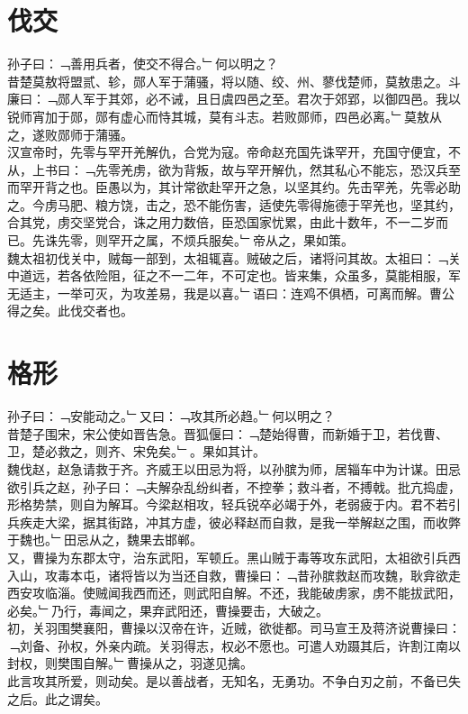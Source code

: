 \chapter{伐交}%
孙子曰：﹁善用兵者，使交不得合。﹂何以明之？\\
昔楚莫敖将盟贰、轸，郧人军于蒲骚，将以随、绞、州、蓼伐楚师，莫敖患之。斗廉曰：﹁郧人军于其郊，必不诫，且日虞四邑之至。君次于郊郢，以御四邑。我以锐师宵加于郧，郧有虚心而恃其城，莫有斗志。若败郧师，四邑必离。﹂莫敖从之，遂败郧师于蒲骚。\\
汉宣帝时，先零与罕开羌解仇，合党为寇。帝命赵充国先诛罕开，充国守便宜，不从，上书曰：﹁先零羌虏，欲为背叛，故与罕开解仇，然其私心不能忘，恐汉兵至而罕开背之也。臣愚以为，其计常欲赴罕开之急，以坚其约。先击罕羌，先零必助之。今虏马肥、粮方饶，击之，恐不能伤害，适使先零得施德于罕羌也，坚其约，合其党，虏交坚党合，诛之用力数倍，臣恐国家忧累，由此十数年，不一二岁而已。先诛先零，则罕开之属，不烦兵服矣。﹂帝从之，果如策。\\
魏太祖初伐关中，贼每一部到，太祖辄喜。贼破之后，诸将问其故。太祖曰：﹁关中道远，若各依险阻，征之不一二年，不可定也。皆来集，众虽多，莫能相服，军无适主，一举可灭，为攻差易，我是以喜。﹂语曰：连鸡不俱栖，可离而解。曹公得之矣。此伐交者也。
%
%
\chapter{格形}%
孙子曰：﹁安能动之。﹂又曰：﹁攻其所必趋。﹂何以明之？\\
昔楚子围宋，宋公使如晋告急。晋狐偃曰：﹁楚始得曹，而新婚于卫，若伐曹、卫，楚必救之，则齐、宋免矣。﹂。果如其计。\\
魏伐赵，赵急请救于齐。齐威王以田忌为将，以孙膑为师，居辎车中为计谋。田忌欲引兵之赵，孙子曰：﹁夫解杂乱纷纠者，不控拳；救斗者，不搏戟。批亢捣虚，形格势禁，则自为解耳。今梁赵相攻，轻兵锐卒必竭于外，老弱疲于内。君不若引兵疾走大梁，据其街路，冲其方虚，彼必释赵而自救，是我一举解赵之围，而收弊于魏也。﹂田忌从之，魏果去邯郸。\\
又，曹操为东郡太守，治东武阳，军顿丘。黑山贼于毒等攻东武阳，太祖欲引兵西入山，攻毒本屯，诸将皆以为当还自救，曹操曰：﹁昔孙膑救赵而攻魏，耿弇欲走西安攻临淄。使贼闻我西而还，则武阳自解。不还，我能破虏家，虏不能拔武阳，必矣。﹂乃行，毒闻之，果弃武阳还，曹操要击，大破之。\\
初，关羽围樊襄阳，曹操以汉帝在许，近贼，欲徙都。司马宣王及蒋济说曹操曰：﹁刘备、孙权，外亲内疏。关羽得志，权必不愿也。可遣人劝蹑其后，许割江南以封权，则樊围自解。﹂曹操从之，羽遂见擒。\\
此言攻其所爱，则动矣。是以善战者，无知名，无勇功。不争白刃之前，不备已失之后。此之谓矣。
%
%
